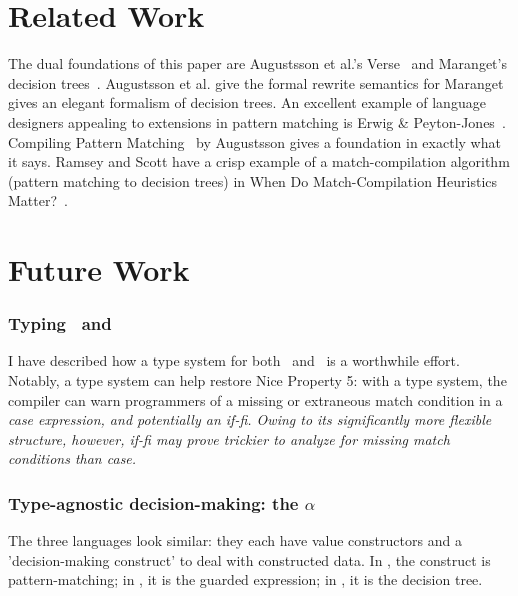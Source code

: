 \documentclass[manuscript,screen,review, 12pt, nonacm]{acmart}
\begin{document}
    \section{Related Work}

    The dual foundations of this paper are Augustsson et al.'s Verse~\cite{verse}
    and Maranget's decision trees~\cite{maranget}. Augustsson et al. give the
    formal rewrite semantics for \VC\; Maranget gives an elegant formalism of
    decision trees. An excellent example of language designers appealing to
    extensions in pattern matching is Erwig \& Peyton-Jones~\cite{guardproposal}.
    Compiling Pattern Matching~\cite{augustsson1985compiling} by Augustsson gives
    a foundation in exactly what it says. Ramsey and Scott have a crisp example
    of a match-compilation algorithm (pattern matching to decision trees) in
    When Do Match-Compilation Heuristics Matter?~\cite{scottramsey}. 
    
    \section{Future Work}        
    \label{futurework}
        \subsubsection{Typing \PPlus\ and \VMinus}
        \label{typingppandvm}

        I have described how a type system for both \PPlus\ and \VMinus\ is a
        worthwhile effort. Notably, a type system can help restore Nice Property
        5: with a type system, the compiler can warn programmers of a missing or
        extraneous match condition in a \it{case} expression, and potentially an
        \it{if-fi}. Owing to its significantly more flexible structure, however,
        \it{if-fi} may prove trickier to analyze for missing match conditions
        than \it{case}.

        \subsubsection{Type-agnostic decision-making: the $\alpha$}
        \label{alphas}

        The three languages look similar: they each have value constructors and
        a 'decision-making construct' to deal with constructed data. In \PPlus, the
        construct is pattern-matching; in \VMinus, it is the guarded expression; in \D,
        it is the decision tree. 
\end{document}
